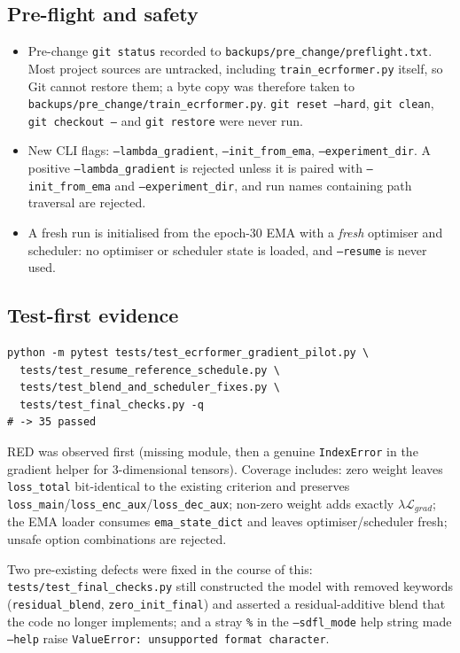 \documentclass[10pt,a4paper]{article}
\newcommand{\code}[1]{\texttt{#1}}
\begin{document}
\subsection{Pre-flight and safety}

\begin{itemize}
\item Pre-change \code{git status} recorded to \code{backups/pre\_change/preflight.txt}. Most
project sources are untracked, including \code{train\_ecrformer.py} itself, so Git cannot restore
them; a byte copy was therefore taken to
\code{backups/pre\_change/train\_ecrformer.py}. \code{git reset --hard}, \code{git clean},
\code{git checkout --} and \code{git restore} were never run.
\item New CLI flags: \code{--lambda\_gradient}, \code{--init\_from\_ema}, \code{--experiment\_dir}.
A positive \code{--lambda\_gradient} is rejected unless it is paired with \code{--init\_from\_ema}
and \code{--experiment\_dir}, and run names containing path traversal are rejected.
\item A fresh run is initialised from the epoch-30 EMA with a \emph{fresh} optimiser and scheduler:
no optimiser or scheduler state is loaded, and \code{--resume} is never used.
\end{itemize}

\subsection{Test-first evidence}

\begin{lstlisting}
python -m pytest tests/test_ecrformer_gradient_pilot.py \
  tests/test_resume_reference_schedule.py \
  tests/test_blend_and_scheduler_fixes.py \
  tests/test_final_checks.py -q
# -> 35 passed
\end{lstlisting}

RED was observed first (missing module, then a genuine \code{IndexError} in the gradient helper
for 3-dimensional tensors). Coverage includes: zero weight leaves \code{loss\_total} bit-identical
to the existing criterion and preserves \code{loss\_main}/\code{loss\_enc\_aux}/\code{loss\_dec\_aux};
non-zero weight adds exactly $\lambda\mathcal{L}_{grad}$; the EMA loader consumes
\code{ema\_state\_dict} and leaves optimiser/scheduler fresh; unsafe option combinations are
rejected.

Two pre-existing defects were fixed in the course of this: \code{tests/test\_final\_checks.py}
still constructed the model with removed keywords (\code{residual\_blend}, \code{zero\_init\_final})
and asserted a residual-additive blend that the code no longer implements; and a stray \code{\%}
in the \code{--sdfl\_mode} help string made \code{--help} raise
\code{ValueError: unsupported format character}.
\end{document}
